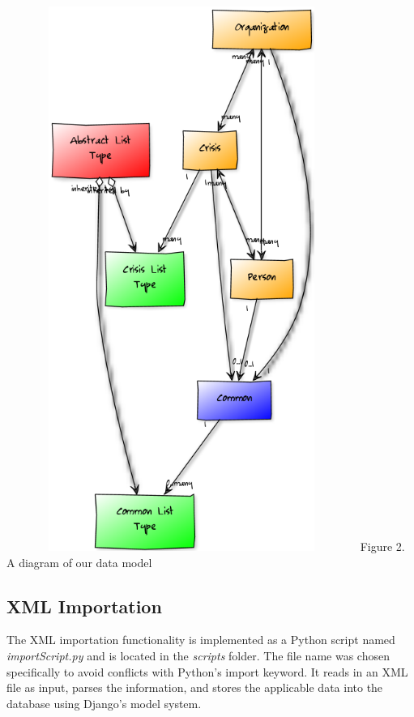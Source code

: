 \documentclass[12pt]{report}
\begin{document}
\includegraphics*[width=4.5in,height=7in]{dataModelDiagram.png}
\newline
\footnotesize
Figure 2. A diagram of our data model %
\normalsize
\hfill\newline

\subsection*{XML Importation}
\hfill


The XML importation functionality is implemented as a Python script named \emph{importScript.py} and is located in the \emph{scripts} folder.
The file name was chosen specifically to avoid conflicts with Python's import keyword.
It reads in an XML file as input, parses the information, and stores the applicable data into the database using Django's model system.\\
\end{document}
